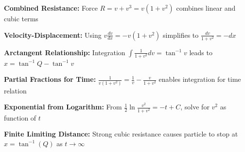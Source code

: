 \begin{takeaways}
\item \textbf{Combined Resistance:} Force $R = v + v^3 = v(1+v^2)$ combines linear and cubic terms
\item \textbf{Velocity-Displacement:} Using $v\frac{dv}{dx} = -v(1+v^2)$ simplifies to $\frac{dv}{1+v^2} = -dx$
\item \textbf{Arctangent Relationship:} Integration $\int \frac{1}{1+v^2}dv = \tan^{-1}v$ leads to $x = \tan^{-1}Q - \tan^{-1}v$
\item \textbf{Partial Fractions for Time:} $\frac{1}{v(1+v^2)} = \frac{1}{v} - \frac{v}{1+v^2}$ enables integration for time relation
\item \textbf{Exponential from Logarithm:} From $\frac{1}{2}\ln\frac{v^2}{1+v^2} = -t + C$, solve for $v^2$ as function of $t$
\item \textbf{Finite Limiting Distance:} Strong cubic resistance causes particle to stop at $x = \tan^{-1}(Q)$ as $t \to \infty$
\end{takeaways}
